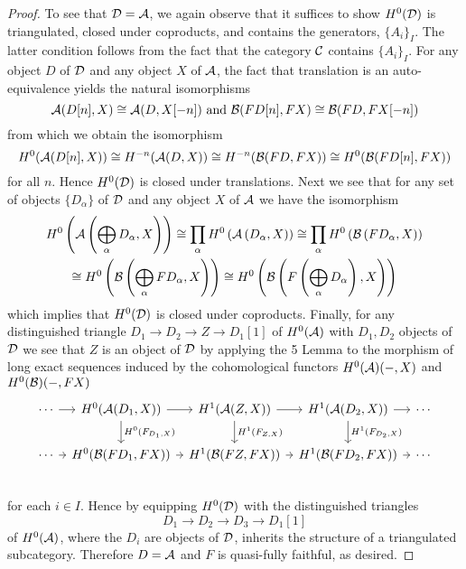 \begin{proof}
  To see that \(\mathcal{D} = \mathcal{A}\), we again observe that it suffices to show \(H^0(\mathcal{D})\) is triangulated, closed under coproducts, and contains the generators, \(\{A_i\}_I\).
  The latter condition follows from the fact that the category \(\mathcal{C}\) contains \(\{A_i\}_I\).
  For any object \(D\) of \(\mathcal{D}\) and any object \(X\) of \(\mathcal{A}\), the fact that translation is an auto-equivalence yields the natural isomorphisms
  \[\A(D[n], X) \cong \A(D, X[-n])\ \text{and}\ \B(FD[n], FX) \cong \B(FD, FX[-n])\]
  from which we obtain the isomorphism
  \[H^0(\mathcal{A}(D[n], X)) \cong H^{-n}(\mathcal{A}(D,X)) \cong H^{-n}(\mathcal{B}(FD, FX)) \cong H^0(\mathcal{B}(FD[n], FX))\]
  for all \(n\).
  Hence \(H^0(\mathcal{D})\) is closed under translations.
  Next we see that for any set of objects \(\{D_\alpha\}\) of \(\mathcal{D}\) and any object \(X\) of \(\mathcal{A}\) we have the isomorphism
  \begin{gather*}
    H^0\left(\mathcal{A}\left(\bigoplus_\alpha D_\alpha, X\right)\right)
  \cong \prod_\alpha H^0\left(\mathcal{A}\left(D_\alpha, X\right)\right)
    \cong \prod_\alpha H^0\left(\mathcal{B}\left(FD_\alpha, X\right)\right)\\
    \cong H^0\left(\mathcal{B}\left(\bigoplus_\alpha FD_\alpha, X\right)\right)
    \cong H^0\left(\mathcal{B}\left(F\left(\bigoplus_\alpha D_\alpha\right), X\right)\right)
  \end{gather*}
  which implies that \(H^0(\mathcal{D})\) is closed under coproducts.
  Finally, for any distinguished triangle \(D_1 \to D_2 \to Z \to D_1[1]\) of \(H^0(\mathcal{A})\) with \(D_1, D_2\) objects of \(\mathcal{D}\) we see that \(Z\) is an object of \(\mathcal{D}\) by applying the 5 Lemma to the morphism of long exact sequences induced by the cohomological functors \(H^0(\mathcal{A})(-, X)\) and \(H^0(\mathcal{B})(-, FX)\)
  \[\begin{tikzcd}[column sep=tiny]
  \cdots \arrow{r} & H^0(\A(D_1, X)) \arrow{r}\arrow{d}{H^0(F_{D_1,X})} & H^1(\A(Z, X)) \arrow{r}\arrow{d}{H^1(F_{Z,X})} & H^1(\A(D_2, X)) \arrow{r}\arrow{d}{H^1(F_{D_2,X})} & \cdots\\
  \cdots \arrow{r} & H^0(\B(FD_1, FX)) \arrow{r} & H^1(\B(FZ, FX)) \arrow{r} & H^1(\B(FD_2, FX)) \arrow{r}& \cdots\\
  \end{tikzcd}\]
  for each \(i \in I\).
  Hence by equipping \(H^0(\mathcal{D})\) with the distinguished triangles
  \[D_1 \to D_2 \to D_3 \to D_1[1]\]
  of \(H^0(\mathcal{A})\), where the \(D_i\) are objects of \(\mathcal{D}\), inherits the structure of a triangulated subcategory.
  Therefore \(D = \mathcal{A}\) and \(F\) is quasi-fully faithful, as desired.
\end{proof}
